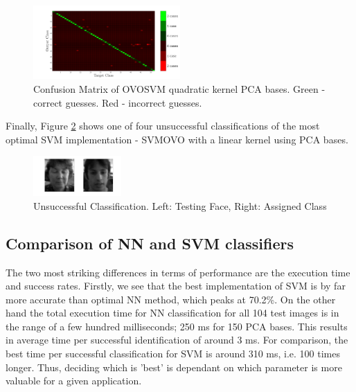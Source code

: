 \documentclass[10pt,twocolumn,letterpaper]{article}
\begin{document}
\begin{figure}[H]
\begin{center}
  
    \includegraphics[width=0.5\textwidth]{../results/Q3_PCA_ONO_confusion}

  \caption{Confusion Matrix of OVOSVM quadratic kernel PCA bases. Green - correct guesses. Red - incorrect guesses. \label{fig:confSVM}}

\end{center}
\end{figure}

Finally, Figure \ref{fig:failSVM} shows one of four unsuccessful classifications of the most optimal SVM implementation - SVMOVO with a linear kernel using PCA bases.

\begin{figure}[H]
\begin{center}
  
    \includegraphics[width=0.3\textwidth]{../results/SVMfail}

  \caption{Unsuccessful Classification. Left: Testing Face, Right: Assigned Class \label{fig:failSVM}}

\end{center}
\end{figure}

\subsection{Comparison of NN and SVM classifiers}
The two most striking differences in terms of performance are the execution time and success rates. Firstly, we see that the best implementation of SVM is by far more accurate than optimal NN method, which peaks at 70.2\%. On the other hand the total execution time for NN classification for all 104 test images is in the range of a few hundred milliseconds; 250 ms for 150 PCA bases. This results in average time per successful identification of around 3 ms. For comparison, the best time per successful classification for SVM is around 310 ms, i.e. 100 times longer. Thus, deciding which is 'best' is dependant on which parameter is more valuable for a given application.
\end{document}
